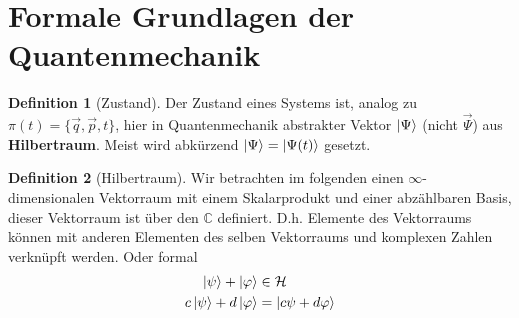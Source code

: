 \documentclass[oneside]{book}
\theoremstyle{definition}
\newtheorem*{definition*}{Definition}
\newcommand{\vp}{\varphi}
\newcommand{\Co}{\mathbb{C}}
\begin{document}
\section{Formale Grundlagen der Quantenmechanik}
\begin{definition*}[Zustand]
	Der Zustand eines Systems ist, analog zu $\pi(t) = \{\vec{q}, \vec{p}, t\}$, hier in Quantenmechanik abstrakter Vektor $\ket{\Psi}$ (nicht $\vec{\Psi}$) aus \textbf{Hilbertraum}. Meist wird abkürzend $\ket{\Psi} = \ket{\Psi(t)}$ gesetzt.
\end{definition*}
\begin{definition*}[Hilbertraum]
	Wir betrachten im folgenden einen $\infty$-dimensionalen Vektorraum mit einem Skalarprodukt und einer abzählbaren Basis, dieser Vektorraum ist über den $\Co$ definiert. D.h. Elemente des Vektorraums können mit anderen Elementen des selben Vektorraums und komplexen Zahlen verknüpft werden. Oder formal
	\begin{align*}
		\ket{\psi} + \ket{\vp} &\in \mathcal{H}\\
		c \ket{\psi} + d \ket{\vp} &= \ket{c \psi + d \vp}
	\end{align*}


\end{definition*}
\end{document}
